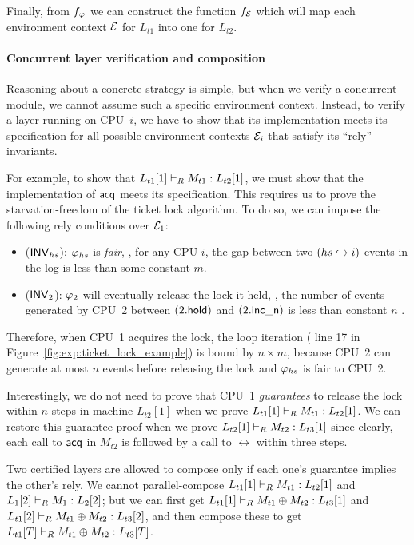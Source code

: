 Finally, from $f_{\varphi_{}}$ we can construct the function
$f_{\mathcal{E}}$ which will map each environment context $\mathcal{E}$ for
$L_{t1}$ into one for $L_{t2}$.

\paragraph{Concurrent layer verification and composition}
Reasoning about a concrete strategy is simple, but when we verify
a concurrent module, we cannot assume such a specific environment context.
Instead, to verify
a layer running on CPU~$i$, we have to show that its implementation
meets its specification for all possible environment contexts
$\mathcal{E}_i$ that satisfy its ``rely'' invariants.

For example, to show that $L_{t1}[1] \vdash_{R} M_{t1} : L_{t2}[1]$, we must
show that the implementation of $\mathsf{acq}$ meets its specification.
This requires us to prove the starvation-freedom of the ticket
lock algorithm. To do so, we can impose the following rely conditions
over $\mathcal{E}_1$:
\begin{itemize} \itemsep 0pt
\item ($\mathsf{INV}_{hs}$):  $\varphi_{hs}$ is \emph{fair}, \ie,
  for any CPU $i$, the gap between two $(hs \hookrightarrow i)$ events
  in the log is less than some constant $m$.
\item ($\mathsf{INV}_{2}$):  $\varphi_{2}$ will eventually release the
  lock it held, \ie, the number of events generated by CPU~2
  between $(2.\mathsf{hold})$ and $(2.\mathsf{inc\_n})$   is less
  than constant $n$ .
\end{itemize}
Therefore, when CPU~1 acquires the lock, the loop iteration (\cf
line 17 in Figure~\ref{fig:exp:ticket_lock_example}) is bound by
$n \times m$, because CPU~2 can generate at most $n$ events before
releasing the lock and $\varphi_{hs}$ is fair to CPU~2.

Interestingly, we do not need
to prove that CPU~1 \emph{guarantees} to release the lock within $n$
steps in machine $L_{t2}[1]$
when we prove $L_{t1}[1] \vdash_{R} M_{t1} : L_{t2}[1]$.  We can restore
this guarantee proof when we prove $L_{t2}[1] \vdash_{R} M_{t2} : L_{t3}[1]$
since clearly, each call to $\mathsf{acq}$ in $M_{t2}$ is followed by a call to
$\rel$ within three steps.

Two certified layers are allowed to compose only if each one's guarantee
implies the other's rely. We cannot parallel-compose
$L_{t1}[1] \vdash_{R} M_{t1} : L_{t2}[1]$ and 
$L_1[2] \vdash_{R} M_1 : L_2[2]$;
but we can first get $L_{t1}[1] \vdash_{R} M_{t1}\oplus{}M_{t2} : L_{t3}[1]$ and
$L_{t1}[2] \vdash_{R} M_{t1}\oplus{}M_{t2} : L_{t3}[2]$, and then compose these to
get $L_{t1}[T] \vdash_{R} M_{t1}\oplus{}M_{t2} : L_{t3}[T]$.

